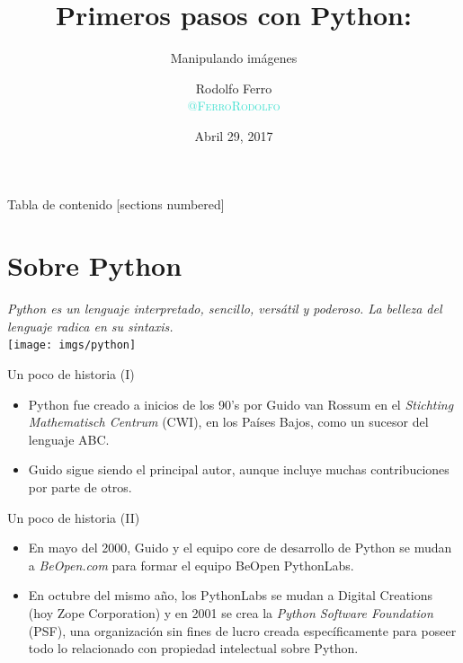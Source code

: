 \documentclass[usenames,dvipsnames]{beamer}
\title{Primeros pasos con Python:}
\subtitle{Manipulando imágenes}
\author{Rodolfo Ferro\\{\footnotesize \textcolor{Turquoise}{\textsc{@FerroRodolfo}}}}
\institute{Universidad de Guanajuato\\ CIMAT A.C.\\
\begin{figure}
  \vspace{-30pt}
  \begin{center}
    \hspace*{-2cm}
    \texttt{[image: imgs/flisol]}
    \hspace*{-4.6cm}
    \vspace{6pt}
    \texttt{[image: imgs/GDG]}
  \end{center}
\end{figure}
}
\date{Abril 29, 2017}
\begin{document}
  \maketitle

  \begin{frame}{Tabla de contenido}
    [sections numbered]
    \tableofcontents[hideallsubsections]
  \end{frame}

  \section{Sobre Python}
  \begin{frame}[standout]
    \textit{Python es un lenguaje interpretado, sencillo, versátil y poderoso.
    La belleza del lenguaje radica en su sintaxis.}\\
    \vspace{1.4cm}
    \texttt{[image: imgs/python]}
  \end{frame}

  \begin{frame}{Un poco de historia (I)}
    \begin{itemize}
      \item Python fue creado a inicios de los 90's por Guido van Rossum en el
      \textit{Stichting Mathematisch Centrum} (CWI), en los Países Bajos, como
      un sucesor del lenguaje ABC.

      \item Guido sigue siendo el principal autor, aunque incluye muchas
      contribuciones por parte de otros.
    \end{itemize}
  \end{frame}

  \begin{frame}{Un poco de historia (II)}
    \begin{itemize}
      \item En mayo del 2000, Guido y el equipo core de desarrollo de Python
      se mudan a \textit{BeOpen.com} para formar el equipo {BeOpen PythonLabs}.

      \item En octubre del mismo año, los PythonLabs se mudan a Digital Creations
      (hoy Zope Corporation) y en 2001 se crea la \textit{Python Software Foundation}
      (PSF), una organización sin fines de lucro creada específicamente para
      poseer todo lo relacionado con propiedad intelectual sobre Python.
    \end{itemize}
  \end{frame}
\end{document}
